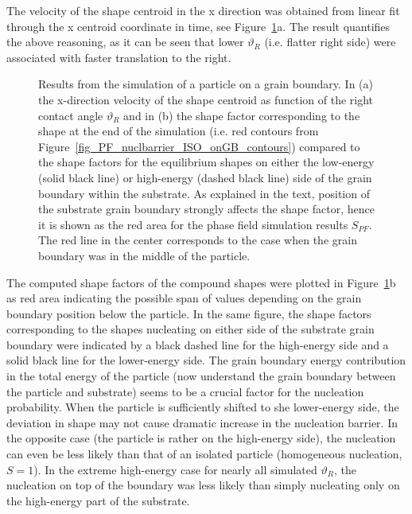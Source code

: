 The velocity of the shape centroid in the x direction was obtained from linear fit through the x centroid coordinate in time, see Figure~\ref{fig_PF_nuclbarrier_ISO_onGB_results}a. The result quantifies the above reasoning, as it can be seen that lower $\vartheta_R$ (i.e. flatter right side) were associated with faster translation to the right.

\begin{figure}
	\centering
	\caption[Results from the simulation of a particle on a grain boundary - velocity of shape motion and the shape factor]{Results from the simulation of a particle on a grain boundary. In (a) the x-direction velocity of the shape centroid as function of the right contact angle $\vartheta_R$ and in (b) the shape factor corresponding to the shape at the end of the simulation (i.e. red contours from Figure~\ref{fig_PF_nuclbarrier_ISO_onGB_contours}) compared to the shape factors for the equilibrium shapes on either the low-energy (solid black line) or high-energy (dashed black line) side of the grain boundary within the substrate. As explained in the text, position of the substrate grain boundary strongly affects the shape factor, hence it is shown as the red area for the phase field simulation results $S_{PF}$. The red line in the center corresponds to the case when the grain boundary was in the middle of the particle.}
	\label{fig_PF_nuclbarrier_ISO_onGB_results}
\end{figure}

The computed shape factors of the compound shapes were plotted in Figure~\ref{fig_PF_nuclbarrier_ISO_onGB_results}b as red area indicating the possible span of values depending on the grain boundary position below the particle. In the same figure, the shape factors corresponding to the shapes nucleating on either side of the substrate grain boundary were indicated by a black dashed line for the high-energy side and a solid black line for the lower-energy side. The grain boundary energy contribution in the total energy of the particle (now understand the grain boundary between the particle and substrate) seems to be a crucial factor for the nucleation probability. When the particle is sufficiently shifted to she lower-energy side, the deviation in shape may not cause dramatic increase in the nucleation barrier. In the opposite case (the particle is rather on the high-energy side), the nucleation can even be less likely than that of an isolated particle (homogeneous nucleation, $S=1$). In the extreme high-energy case for nearly all simulated $\vartheta_R$, the nucleation on top of the boundary was less likely than simply nucleating only on the high-energy part of the substrate. 

